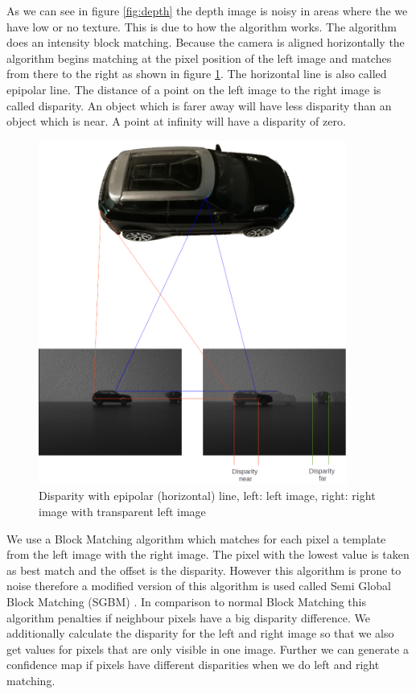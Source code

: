 \documentclass[11pt,a4paper,titlepage,oneside]{report}
\begin{document}
As we can see in figure \ref{fig:depth} the depth image is noisy in areas where the we have low or no texture. This is due to how the algorithm works. The algorithm does an intensity block matching. Because the camera is aligned horizontally the algorithm begins matching at the pixel position of the left image and matches from there to the right as shown in figure \ref{fig:disparity}. The horizontal line is also called epipolar line. The distance of a point on the left image to the right image is called disparity. An object which is farer away will have less disparity than an object which is near. A point at infinity will have a disparity of zero.

\begin{figure}[H]
  \begin{center}
		\includegraphics[width=0.9\textwidth]{img/disparity_concept.png}
  \end{center}
	\caption{Disparity with epipolar (horizontal) line, left: left image, right: right image with transparent left image}\label{fig:disparity}
\end{figure}

We use a Block Matching algorithm which matches for each pixel a template from the left image with the right image. The pixel with the lowest value is taken as best match and the offset is the disparity. However this algorithm is prone to noise therefore a modified version of this algorithm is used called Semi Global Block Matching (SGBM) \cite{sgbm}. In comparison to normal Block Matching this algorithm penalties if neighbour pixels have a big disparity difference. We additionally calculate the disparity for the left and right image so that we also get values for pixels that are only visible in one image. Further we can generate a confidence map if pixels have different disparities when we do left and right matching.
\end{document}
